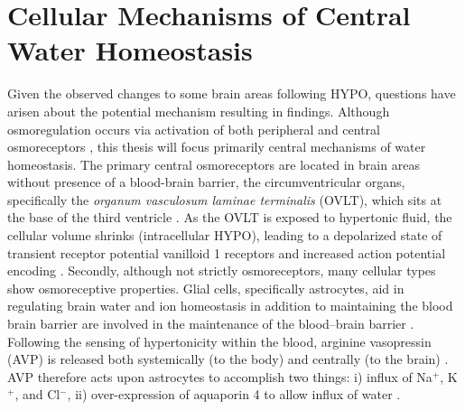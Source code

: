 \section{Cellular Mechanisms of Central Water Homeostasis}
Given the observed changes to some brain areas following HYPO, questions have arisen about the potential mechanism resulting in findings. Although osmoregulation occurs via activation of both peripheral and central osmoreceptors \cite{bourque_central_2008}, this thesis will focus primarily central mechanisms of water homeostasis. The primary central osmoreceptors are located in brain areas without presence of a blood-brain barrier, the circumventricular organs, specifically the \textit{organum vasculosum laminae terminalis} (OVLT), which sits at the base of the third ventricle \cite{bourque_central_2008}. As the OVLT is exposed to hypertonic fluid, the cellular volume shrinks (intracellular HYPO), leading to a depolarized state of transient receptor potential vanilloid 1 receptors \cite{ciura_hypertonicity_2011} and increased action potential encoding \cite{bourque_central_2008}. Secondly, although not strictly osmoreceptors, many cellular types show osmoreceptive properties. Glial cells, specifically astrocytes, aid in regulating brain water and ion homeostasis in addition to maintaining the blood brain barrier are involved in the maintenance of the blood–brain barrier \cite{simard_neurobiology_2004}. Following the sensing of hypertonicity within the blood, arginine vasopressin (AVP) is released both systemically (to the body) and centrally (to the brain) \cite{simard_neurobiology_2004}. AVP therefore acts upon astrocytes to accomplish two things: i) influx of Na${^+}$, K${^+}$, and Cl${^-}$, ii) over-expression of aquaporin 4 to allow influx of water \cite{simard_neurobiology_2004}.   

